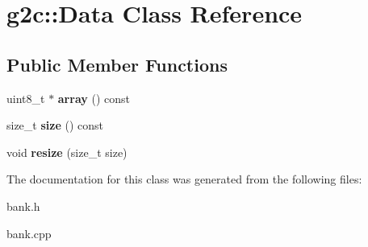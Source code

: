 \hypertarget{classg2c_1_1_data}{
\section{g2c::Data Class Reference}
\label{classg2c_1_1_data}
}
\subsection*{Public Member Functions}
\begin{DoxyCompactItemize}
\item 
\hypertarget{classg2c_1_1_data_a31e0ba61d61c0b0d40a365b0f99013b1}{
uint8\_\-t $\ast$ {\bfseries array} () const }
\label{classg2c_1_1_data_a31e0ba61d61c0b0d40a365b0f99013b1}

\item 
\hypertarget{classg2c_1_1_data_a6c089a44150a66e120fd39d38897b030}{
size\_\-t {\bfseries size} () const }
\label{classg2c_1_1_data_a6c089a44150a66e120fd39d38897b030}

\item 
\hypertarget{classg2c_1_1_data_a74f277f71c65e18265892af281dc205f}{
void {\bfseries resize} (size\_\-t size)}
\label{classg2c_1_1_data_a74f277f71c65e18265892af281dc205f}

\end{DoxyCompactItemize}


The documentation for this class was generated from the following files:\begin{DoxyCompactItemize}
\item 
bank.h\item 
bank.cpp\end{DoxyCompactItemize}
